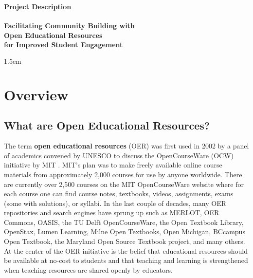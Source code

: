 \documentclass[11pt]{article}
\begin{document}
\thispagestyle{empty}
\begin{center}
\textbf{\Large Project Description}\\[0.25cm]
\hrulefill\\[0.2cm]
\textbf{\Large Facilitating Community Building with \\[0.2ex] Open Educational Resources \\[0.8ex] for Improved Student Engagement}\\
\hrulefill
\end{center}
\baselineskip 1.5em

\tableofcontents

\section{Overview}

\subsection{What are Open Educational Resources?}
The term \textbf{open educational resources} (OER) was first used in 2002 by a panel of academics convened by UNESCO to discuss the OpenCourseWare (OCW) initiative by MIT \cite{unescoforum:02, oerguidelines}.  MIT's plan was to make freely available online course materials from approximately 2,000 courses for use by anyone worldwide.  There are currently over 2,500 courses on the MIT OpenCourseWare website where for each course one can find course notes, textbooks, videos, assignments, exams (some with solutions), or syllabi.  In the last couple of decades, many OER repositories and search engines have sprung up such as MERLOT, OER Commons, OASIS, the TU Delft OpenCourseWare, the Open Textbook Library, OpenStax, Lumen Learning, Milne Open Textbooks, Open Michigan, BCcampus Open Textbook, the Maryland Open Source Textbook project, and many others.  At the center of the OER initiative is the belief that educational resources should be available at no-cost to students and that teaching and learning is strengthened when teaching resources are shared openly by educators.
\end{document}
